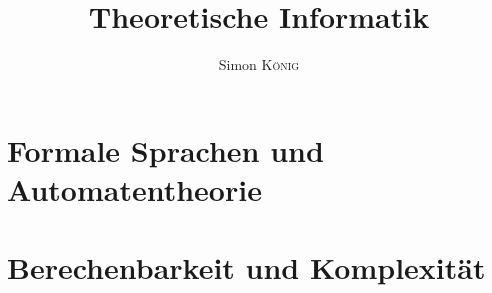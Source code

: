 \documentclass[orange]{simonkoenigzusammenfassung}
\title{Theoretische Informatik\\\subtitleformat{Zusammenfassung zu den Modulen Theoretische Informatik I}}
\author{Simon \textsc{König}}
\begin{document}
\maketitle
\tableofcontents



\part{Formale Sprachen und Automatentheorie}

\part{Berechenbarkeit und Komplexität}
\end{document}
